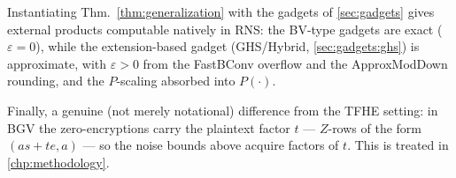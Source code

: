 Instantiating Thm.~\ref{thm:generalization} with the gadgets of \autoref{sec:gadgets} gives external products computable natively in RNS: the BV-type gadgets are exact ($\varepsilon = 0$), while the extension-based gadget (GHS/Hybrid, \autoref{sec:gadgets:ghs}) is approximate, with $\varepsilon > 0$ from the FastBConv overflow and the ApproxModDown rounding, and the $P$-scaling absorbed into $P(\cdot)$.

Finally, a genuine (not merely notational) difference from the TFHE setting: in BGV the zero-encryptions carry the plaintext factor $t$ --- $Z$-rows of the form $(as + te, a)$ --- so the noise bounds above acquire factors of $t$. This is treated in \autoref{chp:methodology}.

\newpage

